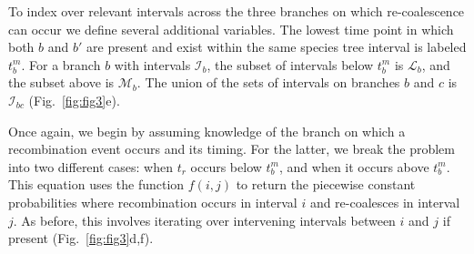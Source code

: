 \documentclass[11pt]{article}
\begin{document}


To index over relevant intervals across the three branches on which re-coalescence
can occur we define several additional variables. The lowest time point in which both 
$b$ and $b'$ are present and exist within the same species tree interval is labeled 
$t_b^m$. For a branch $b$ with intervals $\mathcal{I}_b$, the subset of intervals 
below $t_b^m$ is $\mathcal{L}_b$, and the subset above is $\mathcal{M}_b$. 
The union of the sets of intervals on branches $b$ and $c$ is $\mathcal{I}_{bc}$
(Fig.~\ref{fig:fig3}e).

Once again, we begin by assuming knowledge of the branch on which a 
recombination event occurs and its timing. 
For the latter, we break the problem into two different cases:
when $t_r$ occurs below $t_b^m$, and when it occurs above $t_b^m$.
This equation uses the function $f(i,j)$ to return the piecewise constant
probabilities where recombination occurs in interval $i$ and re-coalesces
in interval $j$. As before, this involves iterating over intervening intervals
between $i$ and $j$ if present (Fig.~\ref{fig:fig3}d,f).




\end{document}

